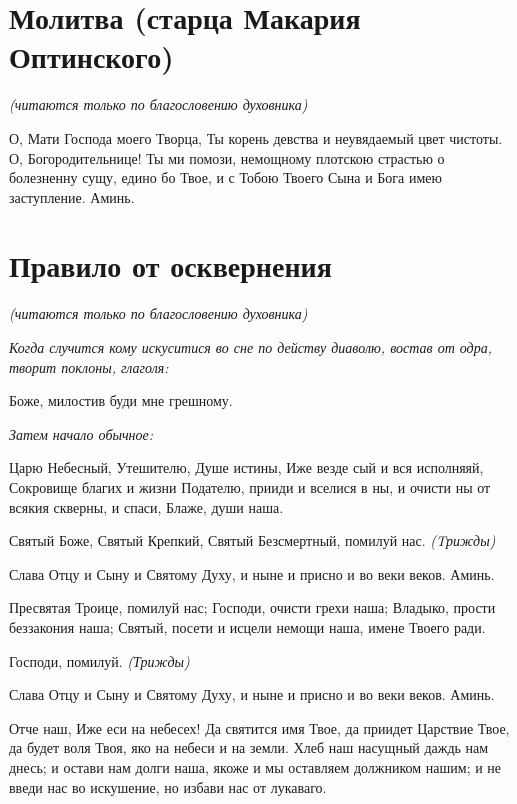 \normalfont{}


\section{Молитва (старца Макария Оптинского)}
 


\itshape (читаются только по благословению духовника)

\normalfont{}


О, Мати Господа моего Творца, Ты корень девства и неувядаемый цвет чистоты. О, Богородительнице! Ты ми помози, немощному плотскою страстью о болезненну сущу, едино бо Твое, и с Тобою Твоего Сына и Бога имею заступление. Аминь.





\section{Правило от осквернения}
 


\itshape (читаются только по благословению духовника)\normalfont{}


\itshape Когда случится кому искуситися во сне по действу диаволю, востав от одра, творит поклоны, глаголя: \normalfont{}


Боже, милостив буди мне грешному.


\itshape Затем начало обычное: \normalfont{}


Царю Небесный, Утешителю, Душе истины, Иже везде сый и вся исполняяй, Сокровище благих и жизни Подателю, прииди и вселися в ны, и очисти ны от всякия скверны, и спаси, Блаже, души наша.


Святый Боже, Святый Крепкий, Святый Безсмертный, помилуй нас. \itshape (Tрижды)\normalfont{}


Слава Отцу и Сыну и Святому Духу, и ныне и присно и во веки веков. Аминь.


Пресвятая Троице, помилуй нас; Господи, очисти грехи наша; Владыко, прости беззакония наша; Святый, посети и исцели немощи наша, имене Твоего ради.


Господи, помилуй. \itshape (Трижды)\normalfont{}


Слава Отцу и Сыну и Святому Духу, и ныне и присно и во веки веков. Аминь.


Отче наш, Иже еси на небесех! Да святится имя Твое, да приидет Царствие Твое, да будет воля Твоя, яко на небеси и на земли. Хлеб наш насущный даждь нам днесь; и остави нам долги наша, якоже и мы оставляем должником нашим; и не введи нас во искушение, но избави нас от лукаваго.


